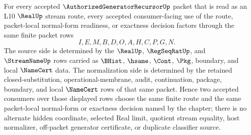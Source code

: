 \begin{corollary}
\label{cor:authorized-generator-recursor-real-stream-route-determinacy}
For every accepted $\AuthorizedGeneratorRecursorUp$ packet that is read as an L10 $\RealUp$ stream route, every accepted consumer-facing use of the route, packet-local normal-form readiness, or exactness decision factors through the same finite packet rows
$$
I,E,M,B,D,O,A,H,C,P,G,N.
$$
The source side is determined by the $\RealUp$, $\RegSeqRatUp$, and $\StreamNameUp$ rows carried as $\BHist$, $\hsame$, $\Cont$, $\Pkg$, boundary, and local $\NameCert$ data. The normalization side is determined by the retained closed-substitution, operational-membrane, audit, continuation, package, boundary, and local $\NameCert$ rows of that same packet. Hence two accepted consumers over those displayed rows choose the same finite route and the same packet-local normal-form or exactness decision named by the chapter; there is no alternate hidden coordinate, selected Real limit, quotient stream equality, host normalizer, off-packet generator certificate, or duplicate classifier source.
\end{corollary}
